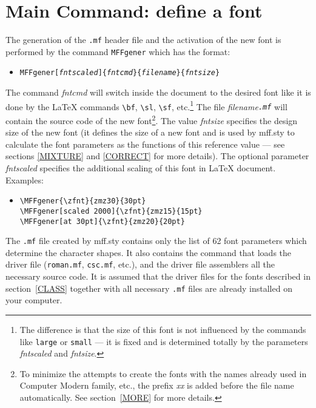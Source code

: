 \section{Main Command: define a font\label{GENER}}

The generation of the {\tt .mf} header file and the activation
of the new font is performed by the command
{\tt\bs{}MFFgener} which has the format:
\begin{itemize}
\item[] \tt \bs{}MFFgener[{\em fntscaled}]\{{\em{\tt\bs}fntcmd}\}\{{\em filename}\}\{{\em fntsize}\}
\end{itemize}
The command {\em{\tt\bs}fntcmd} will switch inside the document
to the desired font like it is done by the \LaTeX{} commands
\verb?\bf?, \verb?\sl?, \verb?\sf?, etc.\footnote{The difference is that
the size of this font is not influenced by the commands like
{\tt\bs{}large} or {\tt\bs{}small} --- it is fixed and is
determined totally by the parameters {\em fntscaled} and {\em fntsize}.}
The file {\em filename{\tt.mf}} will contain the \MF{} source
code of the new font\footnote{To minimize the attempts to create the
fonts with the names already used in Computer Modern family, etc.,
the prefix {\em xx} is added before the file name automatically.
See section~\ref{MORE} for more details.}.
The value {\em fntsize} specifies the design size
of the new font (it defines the size of a new font and
is used by {\sc mff.sty} to calculate the font parameters
as the functions of this reference value ---
see sections \ref{MIXTURE} and \ref{CORRECT} for more details).
The optional parameter {\em fntscaled} specifies
the additional scaling of this font in \LaTeX{} document.
Examples:
\begin{itemize}
\item[]\verb?\MFFgener{\zfnt}{zmz30}{30pt}?\\
       \verb?\MFFgener[scaled 2000]{\zfnt}{zmz15}{15pt}?\\
       \verb?\MFFgener[at 30pt]{\zfnt}{zmz20}{20pt}?
\end{itemize}

The {\tt .mf} file created by {\sc mff.sty}
contains only the list of 62 font
parameters which determine the character shapes.
It also contains the command that loads the
driver file ({\tt roman.mf}, {\tt csc.mf}, etc.),
and the driver file assemblers all the necessary \MF{} source code.
It is assumed that the driver files for the fonts described
in section~\ref{CLASS} together with all necessary
{\tt .mf} files are already installed on your computer.


